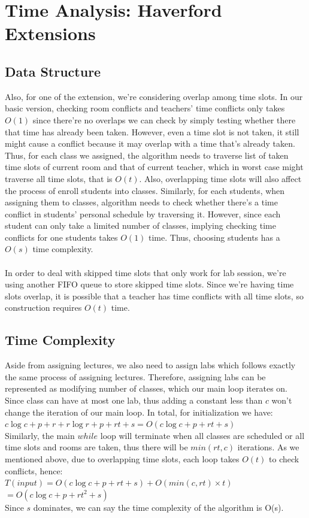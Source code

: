 \documentclass[11pt, oneside]{article}   	%
\begin{document}
\section{Time Analysis: Haverford Extensions}
\subsection{Data Structure}
Also, for one of the extension, we're considering overlap among time slots. In our basic version, checking room conflicts and teachers' time conflicts only takes $O(1)$ since there're no overlaps we can check by simply testing whether there that time has already been taken. However, even a time slot is not taken, it still might cause a conflict because it may overlap with a time that's already taken. Thus, for each class we assigned, the algorithm needs to traverse list of taken time slots of current room and that of current teacher, which in worst case might traverse all time slots, that is $O(t)$. Also, overlapping time slots will also affect the process of enroll students into classes. Similarly, for each students, when assigning them to classes, algorithm needs to check whether there's a time conflict in students' personal schedule by traversing it. However, since each student can only take a limited number of classes, implying checking time conflicts for one students takes $O(1)$ time. Thus, choosing students has a $O(s)$ time complexity.\\
\\In order to deal with skipped time slots that only work for lab session, we're using another FIFO queue to store skipped time slots. Since we're having time slots overlap, it is possible that a teacher has time conflicts with all time slots, so construction requires $O(t)$ time.\\
\subsection{Time Complexity}
Aside from assigning lectures, we also need to assign labs which follows exactly the same process of assigning lectures. Therefore, assigning labs can be represented as modifying number of classes, which our main loop iterates on. Since class can have at most one lab, thus adding a constant less than $c$ won't change the iteration of our main loop. In total, for initialization we have: 
\\\hspace*{30mm}$c\log c + p + r + r\log r+ p + rt + s = O(c\log c + p + rt + s)$
\\Similarly, the main $while$ loop will terminate when all classes are scheduled or all time slots and rooms are taken, thus there will be $min(rt, c)$ iterations. As we mentioned above, due to overlapping time slots, each loop takes $O(t)$ to check conflicts, hence:
\\\hspace*{30mm}$T(input) =  O(c\log c + p + rt + s) + O(min(c, rt)\times t)$
\\\hspace*{46mm}$=O(c\log c + p + rt^2 + s)$\\
Since $s$ dominates, we can say the time complexity of the algorithm is O(s).
\end{document}
